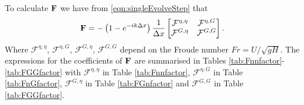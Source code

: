 To calculate $\mathbf{F}$ we have from \eqref{eqn:singleEvolveStep} that
\begin{equation*}
 \mathbf{F} = - \left(1 - e^{-ik\Delta x}\right)\dfrac{1}{ \Delta x}\begin{bmatrix}
 \mathcal{F}^{\eta,\eta} & \mathcal{F}^{\eta,G} \\\mathcal{F}^{G,\eta} &\mathcal{F}^{G,G}
 \end{bmatrix}.
\end{equation*}
Where $\mathcal{F}^{\eta,\eta} $, $\mathcal{F}^{\eta,G}$, $\mathcal{F}^{G,\eta} $, $\mathcal{F}^{G,G} $ depend on the Froude number $Fr = {U}/{\sqrt{gH}}$. The expressions for the coefficients of $\mathbf{F}$ are summarised in Tables \ref{tab:Fnnfactor}-\ref{tab:FGGfactor} with $\mathcal{F}^{\eta,\eta}$ in Table \ref{tab:Fnnfactor}, $\mathcal{F}^{\eta,G}$ in Table \ref{tab:FnGfactor}, $\mathcal{F}^{G,\eta}$ in Table \ref{tab:FGnfactor} and $\mathcal{F}^{G,G}$ in Table \ref{tab:FGGfactor}.

